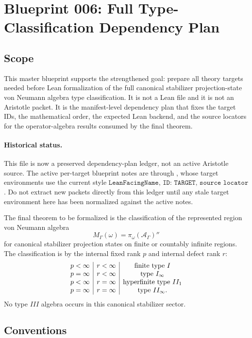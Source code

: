 \documentclass{article}
\newcommand{\cA}{\mathcal A}
\begin{document}
\section*{Blueprint 006: Full Type-Classification Dependency Plan}

\subsection*{Scope}

This master blueprint supports the strengthened goal: prepare all theory
targets needed before Lean formalization of the full canonical stabilizer
projection-state von Neumann algebra type classification.  It is not a Lean
file and it is not an Aristotle packet.  It is the manifest-level dependency
plan that fixes the target IDs, the mathematical order, the expected Lean
backend, and the source locators for the operator-algebra results consumed by
the final theorem.

\paragraph{Historical status.}
This file is now a preserved dependency-plan ledger, not an active Aristotle
source.  The active per-target blueprint notes are
 through
, whose target
environments use the current style
\(\texttt{LeanFacingName, ID: TARGET, source locator}\).  Do not extract new
packets directly from this ledger until any stale target environment here has
been normalized against the active notes.

The final theorem to be formalized is the classification of the represented
region von Neumann algebra
\[
  M_\Gamma(\omega)=\pi_\omega(\cA_\Gamma)''
\]
for canonical stabilizer projection states on finite or countably infinite
regions.  The classification is by the internal fixed rank \(p\) and internal
defect rank \(r\):
\[
\begin{array}{c|c|c}
p<\infty & r<\infty & \hbox{finite type } I\\
p=\infty & r<\infty & \hbox{type } I_\infty\\
p<\infty & r=\infty & \hbox{hyperfinite type } II_1\\
p=\infty & r=\infty & \hbox{type } II_\infty.
\end{array}
\]
No type \(III\) algebra occurs in this canonical stabilizer sector.

\subsection*{Conventions}
\end{document}
